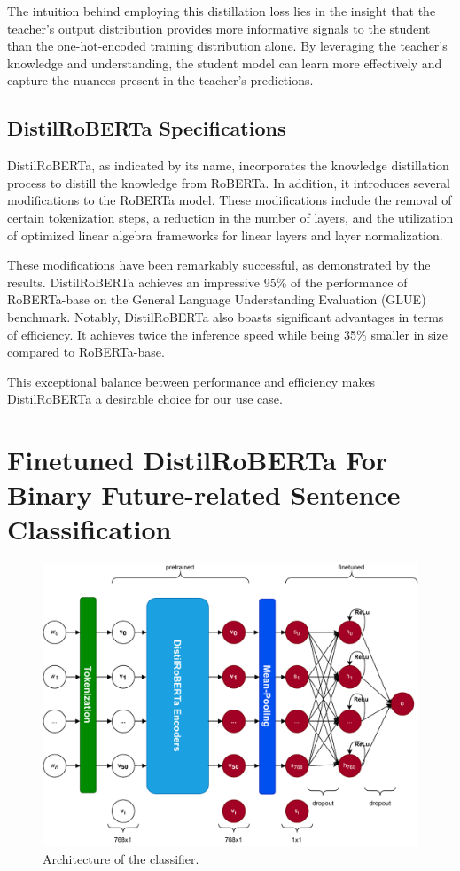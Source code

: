 \documentclass[a4paper,10pt]{report} %
\begin{document}
The intuition behind employing this distillation loss lies in the insight that the teacher's output distribution provides more informative signals to the student than the one-hot-encoded training distribution alone. By leveraging the teacher's knowledge and understanding, the student model can learn more effectively and capture the nuances present in the teacher's predictions. \cite{BucilDistil} \cite{HintonDistilling}

\subsection{DistilRoBERTa Specifications} %
DistilRoBERTa, as indicated by its name, incorporates the knowledge distillation process to distill the knowledge from RoBERTa. In addition, it introduces several modifications to the RoBERTa model. These modifications include the removal of certain tokenization steps, a reduction in the number of layers, and the utilization of optimized linear algebra frameworks for linear layers and layer normalization.

These modifications have been remarkably successful, as demonstrated by the results. DistilRoBERTa achieves an impressive 95\% of the performance of RoBERTa-base on the General Language Understanding Evaluation (GLUE) benchmark. Notably, DistilRoBERTa also boasts significant advantages in terms of efficiency. It achieves twice the inference speed while being 35\% smaller in size compared to RoBERTa-base. 

This exceptional balance between performance and efficiency makes DistilRoBERTa a desirable choice for our use case. \cite{distilbert}

\section{Finetuned DistilRoBERTa For Binary Future-related Sentence Classification}
\begin{figure}
  \centering
  \includegraphics[width=15cm]{img/classifier_archi.pdf}
  \caption{Architecture of the classifier.}
  \label{fig:classifier_archi}
\end{figure}
\end{document}
